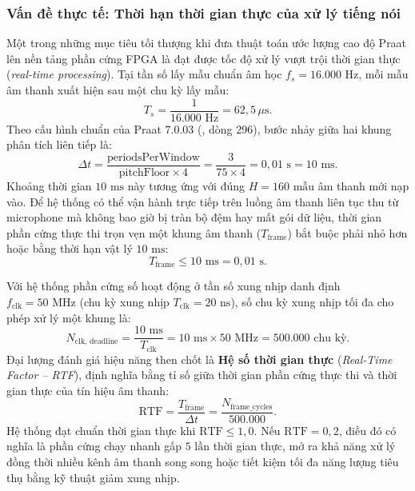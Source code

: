 \subsubsection*{Vấn đề thực tế: Thời hạn thời gian thực của xử lý tiếng nói}
Một trong những mục tiêu tối thượng khi đưa thuật toán ước lượng cao độ Praat lên nền tảng phần cứng FPGA là đạt được tốc độ xử lý vượt trội thời gian thực (\emph{real-time processing}).
Tại tần số lấy mẫu chuẩn âm học $f_s = 16.000\text{ Hz}$, mỗi mẫu âm thanh xuất hiện sau một chu kỳ lấy mẫu:
\begin{equation}
    T_s = \frac{1}{16.000\text{ Hz}} = 62{,}5\,\mu\text{s}.
\end{equation}
Theo cấu hình chuẩn của Praat 7.0.03 (, dòng 296), bước nhảy giữa hai khung phân tích liên tiếp là:
\begin{equation}
    \Delta t = \frac{\text{periodsPerWindow}}{\text{pitchFloor} \times 4} = \frac{3}{75 \times 4} = 0{,}01\text{ s} = 10\text{ ms}.
\end{equation}
Khoảng thời gian $10\text{ ms}$ này tương ứng với đúng $H = 160\text{ mẫu}$ âm thanh mới nạp vào. Để hệ thống có thể vận hành trực tiếp trên luồng âm thanh liên tục thu từ microphone mà không bao giờ bị tràn bộ đệm hay mất gói dữ liệu, thời gian phần cứng thực thi trọn vẹn một khung âm thanh ($T_{\text{frame}}$) bắt buộc phải nhỏ hơn hoặc bằng thời hạn vật lý $10\text{ ms}$:
\begin{equation}
    T_{\text{frame}} \le 10\text{ ms} = 0{,}01\text{ s}.
\end{equation}

Với hệ thống phần cứng số hoạt động ở tần số xung nhịp danh định $f_{\text{clk}} = 50\text{ MHz}$ (chu kỳ xung nhịp $T_{\text{clk}} = 20\text{ ns}$), số chu kỳ xung nhịp tối đa cho phép xử lý một khung là:
\begin{equation}
    N_{\text{clk, deadline}} = \frac{10\text{ ms}}{T_{\text{clk}}} = 10\text{ ms} \times 50\text{ MHz} = 500.000\text{ chu kỳ}.
\end{equation}
Đại lượng đánh giá hiệu năng then chốt là \textbf{Hệ số thời gian thực} (\emph{Real-Time Factor -- RTF}), định nghĩa bằng tỉ số giữa thời gian phần cứng thực thi và thời gian thực của tín hiệu âm thanh:
\begin{equation}
    \text{RTF} = \frac{T_{\text{frame}}}{\Delta t} = \frac{N_{\text{frame\_cycles}}}{500.000}.
\end{equation}
Hệ thống đạt chuẩn thời gian thực khi $\text{RTF} \le 1{,}0$. Nếu $\text{RTF} = 0{,}2$, điều đó có nghĩa là phần cứng chạy nhanh gấp $5\text{ lần}$ thời gian thực, mở ra khả năng xử lý đồng thời nhiều kênh âm thanh song song hoặc tiết kiệm tối đa năng lượng tiêu thụ bằng kỹ thuật giảm xung nhịp.


